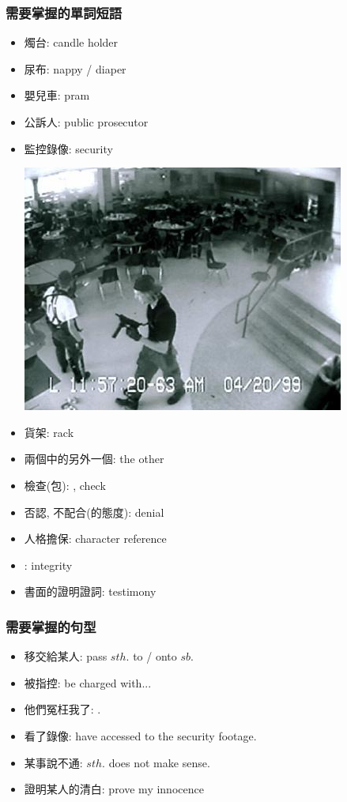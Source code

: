 \subsubsection*{需要掌握的單詞短語}
\begin{multicols}{2}
\begin{itemize}
  \itemsep0em
  \item 燭台: candle holder
  \item 尿布: nappy / diaper
  \item 嬰兒車: pram
  \item 公訴人: public prosecutor
  \item 監控錄像: security 
  \begin{center}
    \includegraphics[scale=.55]{pics/security-footage}
  \end{center}
  \item 貨架: rack
  \item 兩個中的另外一個: the other
  \item 檢查(包): , check
  \item 否認, 不配合(的態度): denial
  \item 人格擔保: character reference
  \item {}: integrity
  \item 書面的證明證詞: testimony
\end{itemize}
\end{multicols}

\subsubsection*{需要掌握的句型}
\begin{multicols}{2}
\begin{itemize}
  \itemsep0em
  \item 移交給某人: pass $sth.$ to / onto $sb.$
  \item 被指控: be charged with...
  \item 他們冤枉我了: .
  \item 看了錄像: have accessed to the security footage.
  \item 某事說不通: $sth.$ does not make sense.
  \item 證明某人的清白: prove my innocence
\end{itemize}
\end{multicols}

